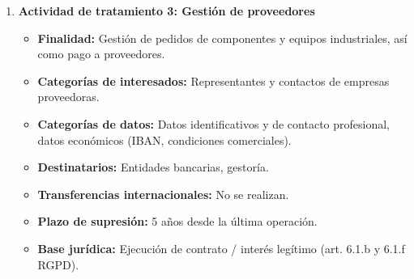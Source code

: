 \clearpage
\begin{solution}
	\begin{enumerate}[label=\textbf{4.}]


		\item \textbf{Actividad de tratamiento 3: Gestión de proveedores}
		      \begin{itemize}
			      \item \textbf{Finalidad:} Gestión de pedidos de componentes y equipos industriales,
			            así como pago a proveedores.
			      \item \textbf{Categorías de interesados:} Representantes y contactos de empresas
			            proveedoras.
			      \item \textbf{Categorías de datos:} Datos identificativos y de contacto profesional,
			            datos económicos (IBAN, condiciones comerciales).
			      \item \textbf{Destinatarios:} Entidades bancarias, gestoría.
			      \item \textbf{Transferencias internacionales:} No se realizan.
			      \item \textbf{Plazo de supresión:} 5 años desde la última operación.
			      \item \textbf{Base jurídica:} Ejecución de contrato / interés legítimo (art. 6.1.b
			            y 6.1.f RGPD).
		      \end{itemize}

	\end{enumerate}

	\medskip

\end{solution}
